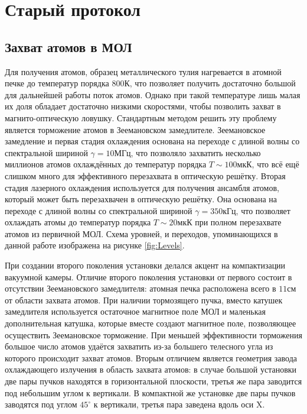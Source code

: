 \section{Старый протокол}

\subsection{Захват атомов в МОЛ}

Для получения атомов, образец металлического тулия нагревается в атомной печке до температур порядка $800\unit{К}$, что позволяет получить достаточно большой для дальнейшей работы поток атомов.
Однако при такой температуре лишь малая их доля обладает достаточно низкими скоростями, чтобы позволить захват в магнито-оптическую ловушку. 
Стандартным методом решить эту проблему является торможение атомов в Зеемановском замедлителе.
Зеемановское замедление и первая стадия охлаждения основана на переходе с длиной волны \fst со спектральной шириной $\gamma = 10\unit{МГц}$, что позволяло захватить несколько миллионов атомов охлаждённых до температур порядка $T\sim100\unit{мкК}$, что всё ещё слишком много для эффективного перезахвата в оптическую решётку.
Вторая стадия лазерного охлаждения используется для получения ансамбля атомов, который может быть перезахвачен в оптическую решётку.
Она основана на переходе с длиной волны \snd  со спектральной шириной $\gamma = 350\unit{кГц}$, что позволяет охлаждать атомы до температур порядка $T\sim20\unit{мкК}$ при полном перезахвате атомов из первичной МОЛ.
Схема уровней, и переходов, упоминающихся в данной работе изображена на рисунке \ref{fig:Levels}.

При создании второго поколения установки делался акцент на компактизации вакуумной камеры.
Отличие второго поколения установки от первого состоит в отсутствии Зеемановского замедлителя: атомная печка расположена всего в $11\unit{см}$ от области захвата атомов.
При наличии тормозящего пучка, вместо катушек замедлителя используется остаточное магнитное поле МОЛ и маленькая дополнительная катушка, которые вместе создают магнитное поле, позволяющее осуществить Зеемановское торможение. 
При меньшей эффективности торможения большое число атомов удаётся захватить из-за большего телесного угла из которого происходит захват атомов.  
Вторым отличием является геометрия завода охлаждающего излучения в область захвата атомов: в случае большой установки две пары пучков находятся в горизонтальной плоскости, третья же пара заводится под небольшим углом к вертикали.
В компактной же установке две пары пучков заводятся под углом $45^\circ$ к вертикали, третья пара заведена вдоль оси X.

